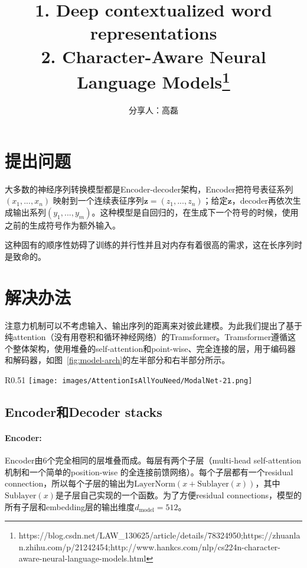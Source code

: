 \documentclass[a4paper,UTF8,no-math]{ctexart}
\title{1. Deep contextualized word representations\\2. Character-Aware Neural Language Models\footnote{https://blog.csdn.net/LAW_130625/article/details/78324950;https://zhuanlan.zhihu.com/p/21242454;http://www.hankcs.com/nlp/cs224n-character-aware-neural-language-models.html}}
\author{分享人：高磊}
\date{ \zhtoday}
\newcommand{\dmodel}{d_{\text{model}}}
\begin{document}
	
	
	\maketitle
	
	\section{提出问题}
	
	大多数的神经序列转换模型都是Encoder-decoder架构，Encoder把符号表征系列 $(x_1, ..., x_n)$ 映射到一个连续表征序列$\mathbf{z} = (z_1, ..., z_n)$；给定$\mathbf{z}$，decoder再依次生成输出系列$(y_1,...,y_m)$。这种模型是自回归的，在生成下一个符号的时候，使用之前的生成符号作为额外输入。
	
	这种固有的顺序性妨碍了训练的并行性并且对内存有着很高的需求，这在长序列时是致命的。
	
	\section{解决办法}
	
	注意力机制可以不考虑输入、输出序列的距离来对彼此建模。为此我们提出了基于纯attention（没有用卷积和循环神经网络）的Tramsformer。Tramsformer遵循这个整体架构，使用堆叠的self-attention和point-wise、完全连接的层，用于编码器和解码器，如图~\ref{fig:model-arch}的左半部分和右半部分所示。
	\begin{wrapfigure}{R}{0.51\textwidth}
		\centering
		\texttt{[image: images/AttentionIsAllYouNeed/ModalNet-21.png]}
		\caption{The Transformer - model architecture.}
		\label{fig:model-arch}
	\end{wrapfigure}
	
	
	\subsection{Encoder和Decoder stacks}
	
	\paragraph{Encoder:}Encoder由6个完全相同的层堆叠而成。每层有两个子层（multi-head self-attention 机制和一个简单的position-wise 的全连接前馈网络）。每个子层都有一个residual connection，所以每个子层的输出为$\mathrm{LayerNorm}(x + \mathrm{Sublayer}(x))$，其中$\mathrm{Sublayer}(x)$是子层自己实现的一个函数。为了方便residual connections，模型的所有子层和embedding层的输出维度$\dmodel=512$。
	
\end{document}
